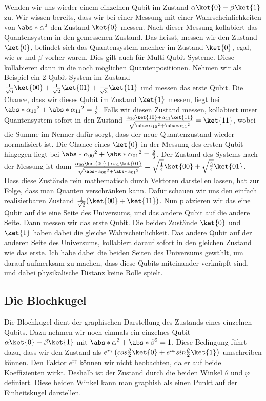 Wenden wir uns wieder einem einzelnen Qubit im Zustand $\alpha\ket{0} + \beta\ket{1}$ zu. Wir wissen bereits, dass wir bei einer Messung mit einer Wahrscheinlichkeiten von $\abs*{\alpha}^2$ den Zustand $\ket{0}$ messen. Nach dieser Messung kollabiert das Quantensystem in den gemessenen Zustand. Das heisst, messen wir den Zustand $\ket{0}$, befindet sich das Quantensystem nachher im Zustand $\ket{0}$, egal, wie $\alpha$ und $\beta$ vorher waren. Dies gilt auch für Multi-Qubit Systeme. Diese kollabieren dann in die noch möglichen Quantenpositionen. Nehmen wir als Beispiel ein 2-Qubit-System im Zustand $\frac{1}{\sqrt{6}}\ket{00} + \frac{1}{\sqrt{2}}\ket{01} + \frac{1}{\sqrt{3}}\ket{11}$ und messen das erste Qubit. Die Chance, dass wir dieses Qubit im Zustand $\ket{1}$ messen, liegt bei $\abs*{\alpha_{10}}^2 + \abs*{\alpha_{11}}^2 = \frac{1}{3}$. Falls wir diesen Zustand messen, kollabiert unser Quantensystem sofort in den Zustand $\frac{\alpha_{10}\ket{10} + \alpha_{11}\ket{11}}{\sqrt{\abs*{\alpha_{10}}^2 + \abs*{\alpha_{11}}^2}} = \ket{11}$, wobei die Summe im Nenner dafür sorgt, dass der neue Quantenzustand wieder normalisiert ist. Die Chance eines $\ket{0}$ in der Messung des ersten Qubit hingegen liegt bei $\abs*{\alpha_{00}}^2 + \abs*{\alpha_{01}}^2 = \frac{2}{3}$. Der Zustand des Systems nach der Messung ist dann $\frac{\alpha_{00}\ket{00} + \alpha_{01}\ket{01}}{\sqrt{\abs*{\alpha_{00}}^2 + \abs*{\alpha_{01}}^2}} = \sqrt{\frac{1}{4}}\ket{00} + \sqrt{\frac{3}{4}}\ket{01}$.
Dass diese Zustände rein mathematisch durch Vektoren darstellen lassen, hat zur Folge, dass man Quanten verschränken kann. Dafür schauen wir uns den einfach realisierbaren Zustand $\frac{1}{\sqrt{2}}(\ket{00} + \ket{11})$. Nun platzieren wir das eine Qubit auf die eine Seite des Universums, und das andere Qubit auf die andere Seite. Dann messen wir das erste Qubit. Die beiden Zustände $\ket{0}$ und $\ket{1}$ haben dabei die gleiche Wahrscheinlichkeit. Das andere Qubit auf der anderen Seite des Universums, kollabiert darauf sofort in den gleichen Zustand wie das erste. Ich habe dabei die beiden Seiten des Universums gewählt, um darauf aufmerksam zu machen, dass diese Qubits miteinander verknüpft sind, und dabei physikalische Distanz keine Rolle spielt.

\subsection{Die Blochkugel}
Die Blochkugel dient der graphischen Darstellung des Zustands eines einzelnen Qubits. Dazu nehmen wir noch einmals ein einzelnes Qubit $\alpha\ket{0} + \beta\ket{1}$ mit $\abs*{\alpha}^2 + \abs*{\beta}^2 = 1$. Diese Bedingung führt dazu, dass wir den Zustand als $e^{i\gamma}\left(cos\frac{\theta}{2}\ket{0} + e^{i\varphi}sin\frac{\theta}{2}\ket{1}\right)$ umschreiben können. Den Faktor $e^{i\gamma}$ können wir nicht beobachten, da er auf beide Koeffizienten wirkt. Deshalb ist der Zustand durch die beiden Winkel $\theta$ und $\varphi$ definiert. Diese beiden Winkel kann man graphish als einen Punkt auf der Einheitskugel darstellen.

